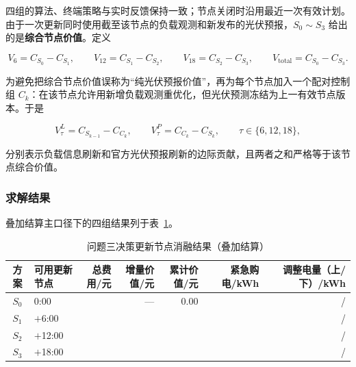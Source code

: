 四组的算法、终端策略与实时反馈保持一致；节点关闭时沿用最近一次有效计划。由于一次更新同时使用截至该节点的负载观测和新发布的光伏预报，$S_0\sim S_3$ 给出的是\textbf{综合节点价值}。定义

\begin{equation}
	V_{6}=C_{S_0}-C_{S_1},\qquad
	V_{12}=C_{S_1}-C_{S_2},\qquad
	V_{18}=C_{S_2}-C_{S_3},\qquad
	V_{\text{total}}=C_{S_0}-C_{S_3}.
	\label{eq:q3-value}
\end{equation}

为避免把综合节点价值误称为“纯光伏预报价值”，再为每个节点加入一个配对控制组 $C_k$：在该节点允许用新增负载观测重优化，但光伏预测冻结为上一有效节点版本。于是

\begin{equation}
	V^{L}_{\tau}=C_{S_{k-1}}-C_{C_k},\qquad
	V^{P}_{\tau}=C_{C_k}-C_{S_k},\qquad
	\tau\in\{6,12,18\},
	\label{eq:q3-paired-value}
\end{equation}

分别表示负载信息刷新和官方光伏预报刷新的边际贡献，且两者之和严格等于该节点综合价值。

\subsubsection{求解结果}

叠加结算主口径下的四组结果列于表~\ref{tab:q3-ablation}。

\begin{table}[htbp]
	\caption{问题三决策更新节点消融结果（叠加结算）}
	\label{tab:q3-ablation}
	\centering
	\begin{tabular}{c l r r r r r}
		\toprule
		方案 & 可用更新节点 & 总费用/元 & 增量价值/元 & 累计价值/元 & 紧急购电/kWh & 调整电量（上/下）/kWh \\
		\midrule
		$S_0$ & 0:00 & \QthreeSzero & --- & 0.00 & \QthreeSzeroEm & \QthreeSzeroUp/\QthreeSzeroDown \\
		$S_1$ & $+$6:00 & \QthreeSone & \QthreeVsix & \QthreeVsix & \QthreeSoneEm & \QthreeSoneUp/\QthreeSoneDown \\
		$S_2$ & $+$12:00 & \QthreeStwo & \QthreeVtwelve & \QthreeVtwelveCum & \QthreeStwoEm & \QthreeStwoUp/\QthreeStwoDown \\
		$S_3$ & $+$18:00 & \QthreeSthree & \QthreeVeighteen & \QthreeVtotal & \QthreeEmergency & \QthreeUp/\QthreeDown \\
		\bottomrule
	\end{tabular}
\end{table}

